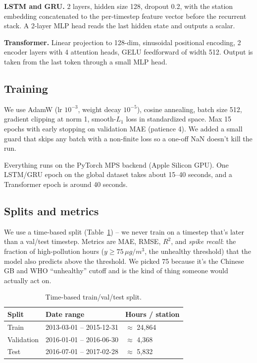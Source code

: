 \documentclass{article}
\begin{document}
\textbf{LSTM and GRU.} 2 layers, hidden size 128, dropout 0.2, with the
station embedding concatenated to the per-timestep feature vector
before the recurrent stack. A 2-layer MLP head reads the last hidden
state and outputs a scalar.

\textbf{Transformer.} Linear projection to 128-dim, sinusoidal
positional encoding, 2 encoder layers with 4 attention heads, GELU
feedforward of width 512. Output is taken from the last token through a
small MLP head.

\subsection{Training}

We use AdamW (lr $10^{-3}$, weight decay $10^{-5}$), cosine annealing,
batch size 512, gradient clipping at norm 1, smooth-$L_1$ loss in
standardized space. Max 15 epochs with early stopping on validation MAE
(patience 4). We added a small guard that skips any batch with a
non-finite loss so a one-off NaN doesn't kill the run.

Everything runs on the PyTorch MPS backend (Apple Silicon GPU). One
LSTM/GRU epoch on the global dataset takes about 15--40 seconds, and a
Transformer epoch is around 40 seconds.

\subsection{Splits and metrics}

We use a time-based split (Table~\ref{tab:splits}) -- we never train
on a timestep that's later than a val/test timestep. Metrics are MAE,
RMSE, $R^2$, and \emph{spike recall}: the fraction of high-pollution
hours ($y \geq 75 \,\mu g/m^3$, the unhealthy threshold) that the
model also predicts above the threshold. We picked 75 because it's the
Chinese GB and WHO ``unhealthy'' cutoff and is the kind of thing
someone would actually act on.

\begin{table}[t]
\centering
\small
\caption{Time-based train/val/test split.}
\label{tab:splits}
\begin{tabular}{lll}
\toprule
\textbf{Split} & \textbf{Date range} & \textbf{Hours / station} \\
\midrule
Train      & 2013-03-01 -- 2015-12-31 & $\approx$ 24{,}864 \\
Validation & 2016-01-01 -- 2016-06-30 & $\approx$ 4{,}368 \\
Test       & 2016-07-01 -- 2017-02-28 & $\approx$ 5{,}832 \\
\bottomrule
\end{tabular}
\end{table}
\end{document}
